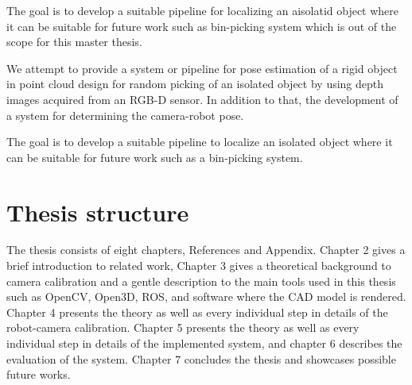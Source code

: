 The goal is to develop a suitable pipeline for localizing an aisolatid object where it can be suitable for future work such as bin-picking system which is out of the scope for this master thesis.
\fi

We attempt to provide a system or pipeline for pose estimation of a rigid object in point cloud design for random picking of an isolated object by using depth images acquired from an RGB-D sensor. In addition to that, the development of a system for determining the camera-robot pose.

The goal is to develop a suitable pipeline to localize an isolated object where it can be suitable for future work such as a bin-picking system.


\section{Thesis structure}

The thesis consists of eight chapters, References and Appendix. Chapter 2 gives a brief introduction to related work, Chapter 3 gives a theoretical background to camera calibration and a gentle description to the main tools used in this thesis such as OpenCV, Open3D, ROS, and software where the CAD model is rendered. Chapter 4 presents the theory as well as every individual step in details of the robot-camera calibration. Chapter 5 presents the theory as well as every individual step in details of the implemented system, and chapter 6 describes the evaluation of the system. Chapter 7 concludes the thesis and showcases possible future works. 

